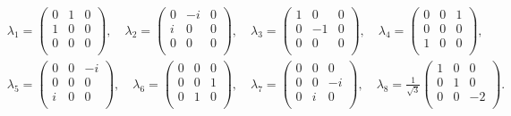 \begin{align*}
	&\lambda_{1}=
	\begin{pmatrix}
		0 & 1 & 0 \\
		1 & 0 & 0 \\
		0 & 0 & 0 \\
	\end{pmatrix},\quad
	\lambda_{2}=
	\begin{pmatrix}
		0 & -i & 0 \\
		i & 0 & 0 \\
		0 & 0 & 0 \\
	\end{pmatrix},\quad
	\lambda_{3}=
	\begin{pmatrix}
		1 & 0 & 0 \\
		0 & -1 & 0 \\
		0 & 0 & 0 \\
	\end{pmatrix},\quad
	\lambda_{4}=
	\begin{pmatrix}
		0 & 0 & 1 \\
		0 & 0 & 0 \\
		1 & 0 & 0 \\
	\end{pmatrix},\\
	&\lambda_{5}=
	\begin{pmatrix}
		0 & 0 & -i \\
		0 & 0 & 0 \\
		i & 0 & 0 \\
	\end{pmatrix},\quad
	\lambda_{6}=
	\begin{pmatrix}
		0 & 0 & 0 \\
		0 & 0 & 1 \\
		0 & 1 & 0 \\
	\end{pmatrix},\quad
	\lambda_{7}=
	\begin{pmatrix}
		0 & 0 & 0 \\
		0 & 0 & -i \\
		0 & i & 0 \\
	\end{pmatrix},\quad
	\lambda_{8}=\frac{1}{\sqrt{3}}
	\begin{pmatrix}
		1 & 0 & 0 \\
		0 & 1 & 0 \\
		0 & 0 & -2 \\
	\end{pmatrix}.
\end{align*}\par
